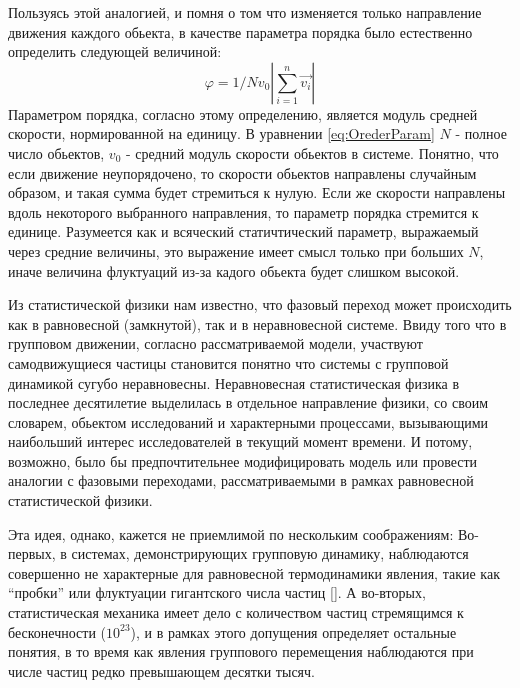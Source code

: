             Пользуясь этой аналогией, и помня о том что изменяется только направление движения каждого обьекта, в качестве параметра порядка было естественно определить следующей величиной:
            \begin{equation}\label{eq:OrederParam}
                \varphi = 1/{N v_0} |{\sum\limits_{i=1}^n \vec{v_i}}|
            \end{equation}
            Параметром порядка, согласно этому определению, является модуль средней скорости, нормированной на единицу. В уравнении \ref{eq:OrederParam} $N$ - полное число обьектов, $v_0$ - средний модуль скорости обьектов в системе. Понятно, что если движение неупорядочено, то скорости обьектов направлены случайным образом, и такая сумма будет стремиться к нулую. Если же скорости направлены вдоль некоторого выбранного направления, то параметр порядка стремится к единице. Разумеется как и всяческий статичтический параметр, выражаемый через средние величины, это выражение имеет смысл только при больших $N$, иначе величина флуктуаций из-за кадого обьекта будет слишком высокой.

            Из статистической физики нам известно, что фазовый переход может происходить как в равновесной (замкнутой), так и в неравновесной системе. Ввиду того что в групповом движении, согласно рассматриваемой модели, участвуют самодвижущиеся частицы становится понятно что системы с групповой динамикой сугубо неравновесны. Неравновесная статистическая физика в последнее десятилетие выделилась в отдельное направление физики, со своим словарем, обьектом исследований и характерными процессами, вызывающими наибольший интерес исследователей в текущий момент времени. И потому, возможно, было бы предпочтительнее модифицировать модель или провести аналогии с фазовыми переходами, рассматриваемыми в рамках равновесной статистической физики. \cite{vicsek2012}

            Эта идея, однако, кажется не приемлимой по нескольким соображениям: Во-первых, в системах, демонстрирующих групповую динамику, наблюдаются совершенно не характерные для равновесной термодинамики явления, такие как ``пробки'' или флуктуации гигантского числа частиц []. А во-вторых, статистическая механика имеет дело с количеством частиц стремящимся к бесконечности ($10^23$), и в рамках этого допущения определяет остальные понятия, в то время как явления группового перемещения наблюдаются при числе частиц редко превышающем десятки тысяч.

